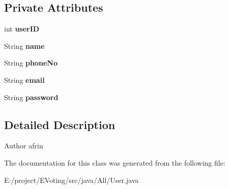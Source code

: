 \subsection*{Private Attributes}
\begin{DoxyCompactItemize}
\item 
\mbox{\label{class_models_1_1_user_ae838081787cddbdd2c4a10d811c0ffc0}} 
int {\bfseries user\+ID}
\item 
\mbox{\label{class_models_1_1_user_a1c241daf6fe72e2c9a3b1f52286a5a09}} 
String {\bfseries name}
\item 
\mbox{\label{class_models_1_1_user_a92e4b03f545edf89f8c98c675acda802}} 
String {\bfseries phone\+No}
\item 
\mbox{\label{class_models_1_1_user_a52079a30d0029cb7ad133b7bf9360f02}} 
String {\bfseries email}
\item 
\mbox{\label{class_models_1_1_user_a4010d8dbe3b15d25e1448b110940e1b4}} 
String {\bfseries password}
\end{DoxyCompactItemize}


\subsection{Detailed Description}
\begin{DoxyAuthor}{Author}
afrin 
\end{DoxyAuthor}


The documentation for this class was generated from the following file\+:\begin{DoxyCompactItemize}
\item 
E\+:/project/\+E\+Voting/src/java/\+All/User.\+java\end{DoxyCompactItemize}

